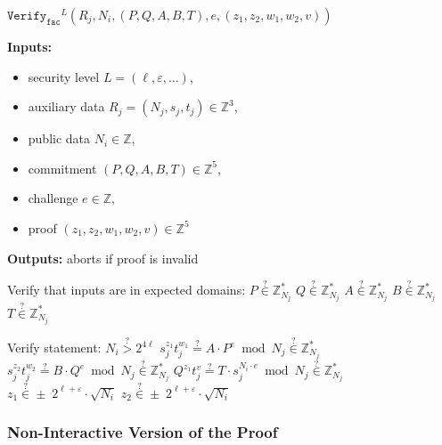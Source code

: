 \documentclass[11pt]{article}
\newenvironment{inlineAlgorithm}{}{}
\newcommand{\algoName}[1]{#1 \par}
\newcommand{\algoInputsList}[1]{
    {\small \bf Inputs:} 
        \begin{itemize}[noitemsep,topsep=0pt]
            #1
        \end{itemize}
}
\newcommand{\algoOutputs}[1]{
    {\small \bf Outputs:} #1 \par
}
\newcommand{\verify}[1]{\ensuremath{\mathtt{Verify}_{\mathtt{#1}}}}
\newcommand{\Z}{\mathbb{Z}}
\newcommand{\?}[1]{\stackrel{?}{#1}}
\begin{document}
\begin{description}
\item
\begin{inlineAlgorithm}
\algoName{$\verify{fac}^L(
    R_j,
    N_i,
    (P, Q, A, B, T),
    e,
    (z_1, z_2, w_1, w_2, v)
)$}
\algoInputsList{
    \item security level $L = (\ell, \varepsilon, \dots)$,
    \item auxiliary data $R_j = (N_j, s_j, t_j) \in \Z^3$,
    \item public data $N_i \in \Z$,
    \item commitment $(P, Q, A, B, T) \in \Z^5$,
    \item challenge $e \in \Z$,
    \item proof $(z_1, z_2, w_1, w_2, v) \in \Z^5$
}
\algoOutputs{aborts if proof is invalid}
\begin{algorithmic}[1]
\Statex Verify that inputs are in expected domains:
\State $P \? \in \Z^*_{N_j}$
\State $Q \? \in \Z^*_{N_j}$
\State $A \? \in \Z^*_{N_j}$
\State $B \? \in \Z^*_{N_j}$
\State $T \? \in \Z^*_{N_j}$

\Statex Verify statement:
\State $N_i \? > 2^{4 \ell}$
\State $s_j^{z_1} t_j^{w_1} \? = A \cdot P^e \bmod N_j \? \in \Z^*_{N_j}$ 
\State $s_j^{z_2} t_j^{w_2} \? = B \cdot Q^e \bmod N_j \? \in \Z^*_{N_j}$
\State $Q^{z_1} t_j^{v} \? = T \cdot s_j^{N_i \cdot e} \bmod N_j \? \in \Z^*_{N_j}$ 
\State $z_1 \? \in \pm \; 2^{\ell + \varepsilon} \cdot \sqrt{N_i}$ 
\State $z_2 \? \in \pm \; 2^{\ell + \varepsilon} \cdot \sqrt{N_i}$
\end{algorithmic}
\end{inlineAlgorithm}

\end{description}

\subsubsection{Non-Interactive Version of the Proof}
\end{document}
